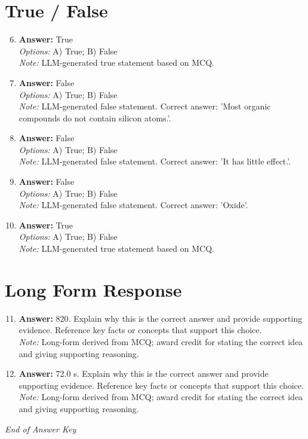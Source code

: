 \documentclass[12pt]{article}
\begin{document}
\section*{True / False}
\begin{enumerate}[label=\arabic*.]
\setcounter{enumi}{5}
\item \textbf{Answer:} True
\\ \textit{Options:} A) True; B) False
\\ \textit{Note:} LLM-generated true statement based on MCQ.
\item \textbf{Answer:} False
\\ \textit{Options:} A) True; B) False
\\ \textit{Note:} LLM-generated false statement. Correct answer: 'Most organic compounds do not contain silicon atoms.'.
\item \textbf{Answer:} False
\\ \textit{Options:} A) True; B) False
\\ \textit{Note:} LLM-generated false statement. Correct answer: 'It has little effect.'.
\item \textbf{Answer:} False
\\ \textit{Options:} A) True; B) False
\\ \textit{Note:} LLM-generated false statement. Correct answer: 'Oxide'.
\item \textbf{Answer:} True
\\ \textit{Options:} A) True; B) False
\\ \textit{Note:} LLM-generated true statement based on MCQ.
\end{enumerate}

\section*{Long Form Response}
\begin{enumerate}[label=\arabic*.]
\setcounter{enumi}{10}
\item \textbf{Answer:} 820. Explain why this is the correct answer and provide supporting evidence. Reference key facts or concepts that support this choice.
\\ \textit{Note:} Long-form derived from MCQ; award credit for stating the correct idea and giving supporting reasoning.
\item \textbf{Answer:} 72.0 s. Explain why this is the correct answer and provide supporting evidence. Reference key facts or concepts that support this choice.
\\ \textit{Note:} Long-form derived from MCQ; award credit for stating the correct idea and giving supporting reasoning.
\end{enumerate}

\vfill
\noindent\textit{End of Answer Key}
\end{document}
